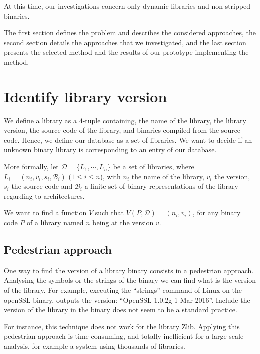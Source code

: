 \documentclass{article}
\begin{document}
    At this time, our investigations concern only dynamic libraries and non-stripped binaries.
    
    The first section defines the problem and describes the considered
    approaches, the second section details the approaches that we investigated, and the last section presents the selected method and the results of our prototype implementing the method.
    

   \section{Identify library version}
   
   We define a library as a $4$-tuple containing, the name of the
   library, the library version, the source code of the library, and binaries
   compiled from the source code. Hence, we define our database as a set of libraries. We want to decide if an unknown binary library is corresponding to an entry of our database.

   More formally, let $\mathcal{D} = \{ L_1, \cdots, L_n\}$ be a set of libraries, where
   $L_i = (n_i, v_i, s_i, \mathcal{B}_i)$ ($1 \le i \le n$), with $n_i$ the name of the library,
   $v_i$ the version, $s_i$ the source code and $\mathcal{B}_i$ a finite set of
   binary representations of the library regarding to architectures.

  We want to find a function $V$ such that $V(P,\mathcal{D}) = (n_i,
   v_i)$, for any binary code $P$ of a library named $n$ being at the version $v$. 
   

	\subsection{Pedestrian approach}
    
	One way to find the version of a library binary consists in a pedestrian approach. Analysing the symbols or the strings of the binary we can find what is the version of the library. For example, executing the ``strings'' command of Linux on the openSSL binary, outputs the version: ``OpenSSL 1.0.2g  1 Mar 2016''. Include the version of the library in the binary does not seem to be a standard practice.


	For instance, this technique does not work for the library Zlib. Applying this pedestrian approach is time consuming, and totally inefficient for a large-scale analysis, for example a system using thousands of libraries. 
\end{document}
